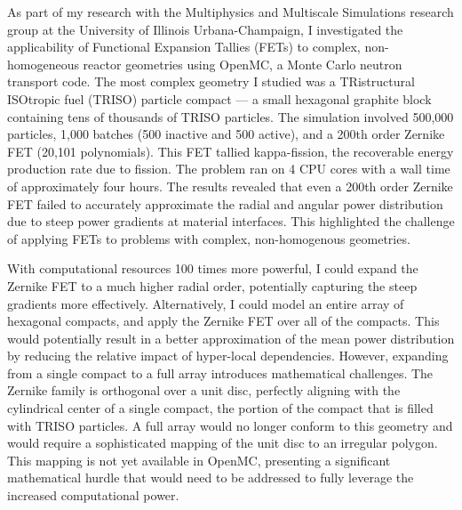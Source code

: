 \documentclass[12pt]{letter}
\begin{document}
As part of my research with the Multiphysics and Multiscale Simulations
research group at the University of Illinois Urbana-Champaign, I investigated
the applicability of Functional Expansion Tallies (FETs) to complex,
non-homogeneous reactor geometries using OpenMC, a Monte Carlo neutron
transport code. The most complex geometry I studied was a TRistructural
ISOtropic fuel (TRISO) particle compact --- a small hexagonal graphite block
containing tens of thousands of TRISO particles. The simulation involved
500,000 particles, 1,000 batches (500 inactive and 500 active), and a 200th
order Zernike FET (20,101 polynomials). This FET tallied kappa-fission, the
recoverable energy production rate due to fission. The problem ran on 4 CPU
cores with a wall time of approximately four hours. The results revealed that
even a 200th order Zernike FET failed to accurately approximate the radial and
angular power distribution due to steep power gradients at material interfaces.
This highlighted the challenge of applying FETs to problems with complex,
non-homogenous geometries.

With computational resources 100 times more powerful, I could expand the
Zernike FET to a much higher radial order, potentially capturing the steep
gradients more effectively. Alternatively, I could model an entire array of
hexagonal compacts, and apply the Zernike FET over all of the compacts. This
would potentially result in a better approximation of the mean power
distribution by reducing the relative impact of hyper-local dependencies.
However, expanding from a single compact to a full array introduces
mathematical challenges. The Zernike family is orthogonal over a unit disc,
perfectly aligning with the cylindrical center of a single compact, the portion
of the compact that is filled with TRISO particles. A full array would no
longer conform to this geometry and would require a sophisticated mapping of
the unit disc to an irregular polygon. This mapping is not yet available in
OpenMC, presenting a significant mathematical hurdle that would need to be
addressed to fully leverage the increased computational power. 
\end{document}
